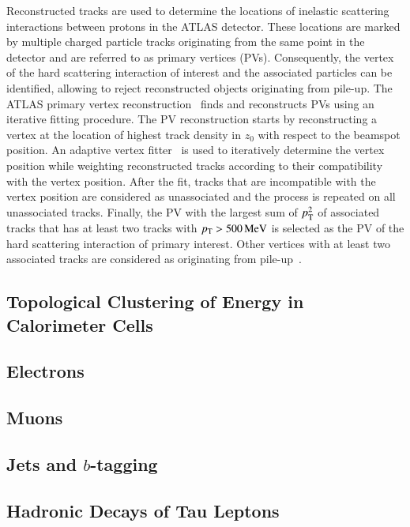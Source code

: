 
Reconstructed tracks are used to determine the locations of inelastic scattering
interactions between protons in the ATLAS detector. These locations are marked
by multiple charged particle tracks originating from the same point in the
detector and are referred to as primary vertices (PVs). Consequently, the vertex
of the hard scattering interaction of interest and the associated particles can
be identified, allowing to reject reconstructed objects originating from
pile-up. The ATLAS primary vertex reconstruction~\cite{PERF-2015-01} finds and
reconstructs PVs using an iterative fitting procedure. The PV reconstruction
starts by reconstructing a vertex at the location of highest track density in
$z_0$ with respect to the beamspot position. An adaptive vertex
fitter~\cite{Fruhwirth:2007hz} is used to iteratively determine the vertex
position while weighting reconstructed tracks according to their compatibility
with the vertex position. After the fit, tracks that are incompatible with the
vertex position are considered as unassociated and the process is repeated on
all unassociated tracks. Finally, the PV with the largest sum of $p_{\text{T}}^2$ of
associated tracks that has at least two tracks with $p_{\text{T}} > \SI{500}{\ensuremath{\text{MeV}}}$ is
selected as the PV of the hard scattering interaction of primary interest. Other
vertices with at least two associated tracks are considered as originating from
pile-up~\cite{PERF-2015-01}.


\subsection{Topological Clustering of Energy in Calorimeter Cells}

\subsection{Electrons}

\subsection{Muons}

\subsection{Jets and $b$-tagging}

\subsection{Hadronic Decays of Tau Leptons}

